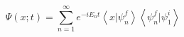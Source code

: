 $$
\Psi(x; t) =
\sum_{n=1}^{\infty}{
 e^{-iE_{n}t}
 \left\langle
   x
   |
   \psi^{f}_{n}
 \right\rangle
 \left\langle
   \psi^{f}_{n}
   |
   \psi^{i}_{1}
 \right\rangle
}
$$
